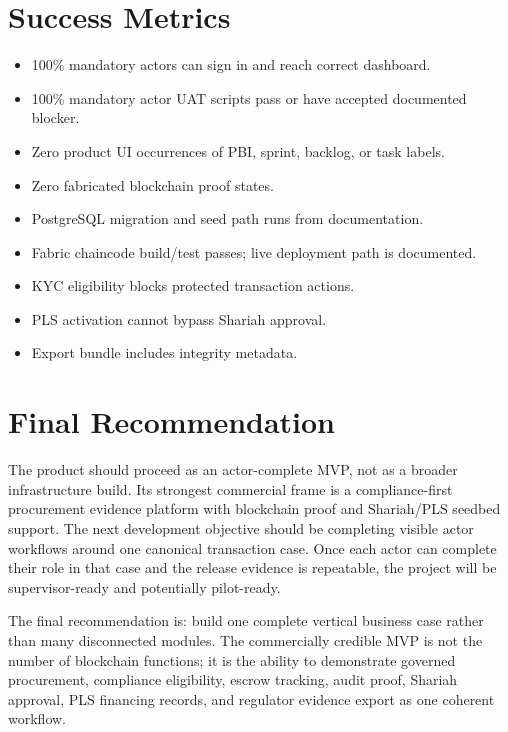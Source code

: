 \documentclass[conference]{IEEEtran}
\begin{document}
\section{Success Metrics}

\begin{itemize}
    \item 100\% mandatory actors can sign in and reach correct dashboard.
    \item 100\% mandatory actor UAT scripts pass or have accepted documented blocker.
    \item Zero product UI occurrences of PBI, sprint, backlog, or task labels.
    \item Zero fabricated blockchain proof states.
    \item PostgreSQL migration and seed path runs from documentation.
    \item Fabric chaincode build/test passes; live deployment path is documented.
    \item KYC eligibility blocks protected transaction actions.
    \item PLS activation cannot bypass Shariah approval.
    \item Export bundle includes integrity metadata.
\end{itemize}

\section{Final Recommendation}

The product should proceed as an actor-complete MVP, not as a broader infrastructure build. Its strongest commercial frame is a compliance-first procurement evidence platform with blockchain proof and Shariah/PLS seedbed support. The next development objective should be completing visible actor workflows around one canonical transaction case. Once each actor can complete their role in that case and the release evidence is repeatable, the project will be supervisor-ready and potentially pilot-ready.

The final recommendation is: build one complete vertical business case rather than many disconnected modules. The commercially credible MVP is not the number of blockchain functions; it is the ability to demonstrate governed procurement, compliance eligibility, escrow tracking, audit proof, Shariah approval, PLS financing records, and regulator evidence export as one coherent workflow.
\end{document}
